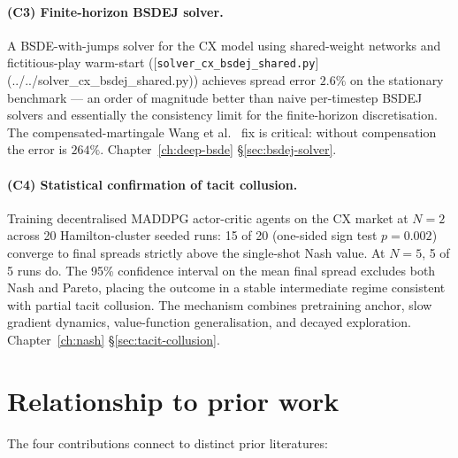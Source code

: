 \paragraph{(C3) Finite-horizon BSDEJ solver.}  A BSDE-with-jumps solver for the CX model using shared-weight networks and fictitious-play warm-start ([\texttt{solver\_cx\_bsdej\_shared.py}](../../solver_cx_bsdej_shared.py)) achieves spread error $2.6\%$ on the stationary benchmark --- an order of magnitude better than naive per-timestep BSDEJ solvers and essentially the consistency limit for the finite-horizon discretisation. The compensated-martingale Wang et al.\ \cite{wang2023} fix is critical: without compensation the error is $264\%$. Chapter~\ref{ch:deep-bsde} \S\ref{sec:bsdej-solver}.

\paragraph{(C4) Statistical confirmation of tacit collusion.}  Training decentralised MADDPG actor-critic agents on the CX market at $N = 2$ across 20 Hamilton-cluster seeded runs: 15 of 20 (one-sided sign test $p = 0.002$) converge to final spreads strictly above the single-shot Nash value. At $N = 5$, 5 of 5 runs do. The 95\% confidence interval on the mean final spread excludes both Nash and Pareto, placing the outcome in a stable intermediate regime consistent with partial tacit collusion. The mechanism combines pretraining anchor, slow gradient dynamics, value-function generalisation, and decayed exploration. Chapter~\ref{ch:nash} \S\ref{sec:tacit-collusion}.

\section{Relationship to prior work}

The four contributions connect to distinct prior literatures:

